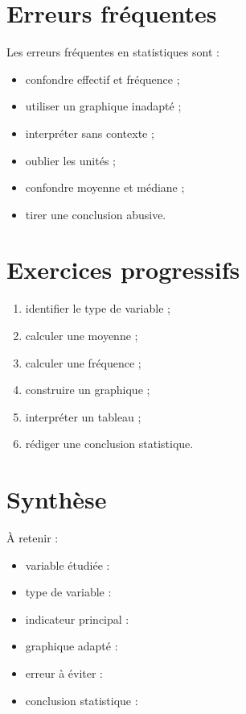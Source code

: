 \documentclass[11pt,a4paper]{article}
\begin{document}
\section{Erreurs fréquentes}

\begin{cadreattention}
Les erreurs fréquentes en statistiques sont :
\begin{itemize}
    \item confondre effectif et fréquence ;
    \item utiliser un graphique inadapté ;
    \item interpréter sans contexte ;
    \item oublier les unités ;
    \item confondre moyenne et médiane ;
    \item tirer une conclusion abusive.
\end{itemize}
\end{cadreattention}

\section{Exercices progressifs}

\begin{cadreactivite}
\begin{enumerate}
    \item identifier le type de variable ;
    \item calculer une moyenne ;
    \item calculer une fréquence ;
    \item construire un graphique ;
    \item interpréter un tableau ;
    \item rédiger une conclusion statistique.
\end{enumerate}
\end{cadreactivite}

\section{Synthèse}

\begin{cadresynthese}
À retenir :

\begin{itemize}
    \item variable étudiée : \dotfill
    \item type de variable : \dotfill
    \item indicateur principal : \dotfill
    \item graphique adapté : \dotfill
    \item erreur à éviter : \dotfill
    \item conclusion statistique : \dotfill
\end{itemize}
\end{cadresynthese}
\end{document}
